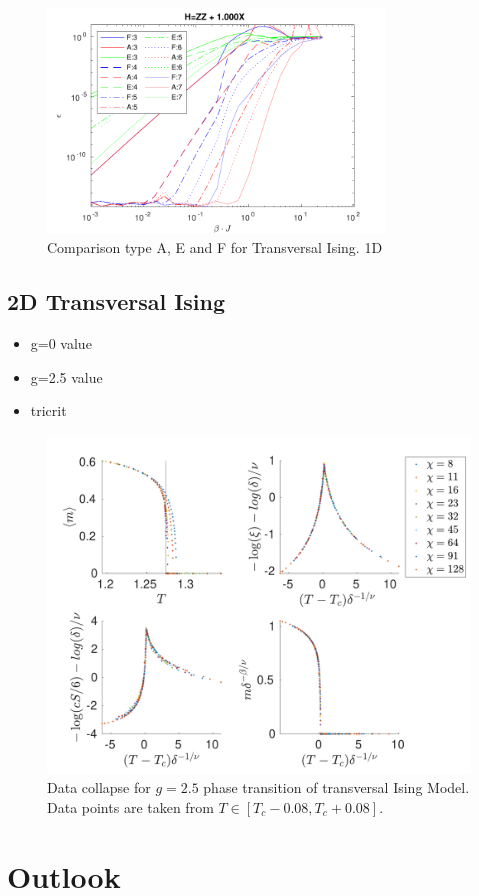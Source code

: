 \documentclass[twocolumn]{article}
\newcounter{a}
\newcounter{b}
\begin{document}
\begin{figure}[h!]
    \center
    \includegraphics[width=0.8\textwidth]{../Figuren/benchmarking/t_ising.pdf}
    \caption{Comparison type A, E and F for Transversal Ising. 1D }
    \label{fig:benchmark:tising}
\end{figure}


\subsection{2D Transversal Ising}

\begin{itemize}
    \item g=0 value
    \item g=2.5 value
    \item tricrit
\end{itemize}

\begin{figure}[h!]
    \center
    \includegraphics[width=\textwidth]{../Figuren/phasediag/g25/zoomed.pdf}
    \caption{ Data collapse for $g=2.5$ phase transition of transversal Ising Model. Data points are taken from $T \in \left[ T_c -0.08, T_c +0.08 \right]$. }
    \label{fig:phase:g25:zoomed}
\end{figure}

\section{Outlook}



\end{document}
